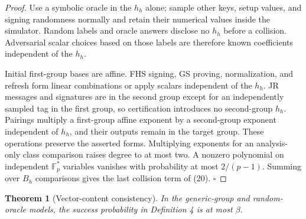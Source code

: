 \documentclass[11pt]{article}
\newtheorem{theorem}{Theorem}
\begin{document}
\begin{proof}
Use a symbolic oracle in the \(h_h\) alone; sample other keys, setup values, and signing randomness normally and retain their numerical values inside the simulator. Random labels and oracle answers disclose no \(h_h\) before a collision. Adversarial scalar choices based on those labels are therefore known coefficients independent of the \(h_h\).

Initial first-group bases are affine. FHS signing, GS proving, normalization, and refresh form linear combinations or apply scalars independent of the \(h_h\). JR messages and signatures are in the second group except for an independently sampled tag in the first group, so certification introduces no second-group \(h_h\). Pairings multiply a first-group affine exponent by a second-group exponent independent of \(h_h\), and their outputs remain in the target group. These operations preserve the asserted forms. Multiplying exponents for an analysis-only class comparison raises degree to at most two. A nonzero polynomial on independent \(\mathbb F_p^*\) variables vanishes with probability at most \(2/(p-1)\). Summing over \(B_h\) comparisons gives the last collision term of (20). \(\square\)

\end{proof}
\begin{theorem}[Vector-content consistency]
In the generic-group and random-oracle models, the success probability in Definition 4 is at most \(\beta\).

\end{theorem}
\end{document}
